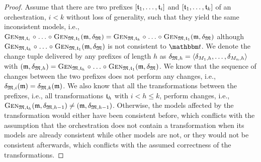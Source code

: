 \begin{proof}
    Assume that there are two prefixes $\sequenced{\transformation{t}_{1}, \dots, \transformation{t}_{i}}$ and $\sequenced{\transformation{t}_{1}, \dots, \transformation{t}_{k}}$ of an orchestration, $i < k$ without loss of generality, such that they yield the same inconsistent models, i.e., $\generalizationfunction{\metamodeltuple{M}, \transformation{t}_{i}} \concatfunction \dots \concatfunction \generalizationfunction{\metamodeltuple{M}, \transformation{t}_{1}}(\modeltuple{m}, \changetuple{\metamodeltuple{M}}) = \generalizationfunction{\metamodeltuple{M}, \transformation{t}_{k}} \concatfunction \dots \concatfunction \generalizationfunction{\metamodeltuple{M}, \transformation{t}_{1}}(\modeltuple{m}, \changetuple{\metamodeltuple{M}})$ although $\generalizationfunction{\metamodeltuple{M}, \transformation{t}_{k}} \concatfunction \dots \concatfunction \generalizationfunction{\metamodeltuple{M}, \transformation{t}_{1}}(\modeltuple{m}, \changetuple{\metamodeltuple{M}})$ is not consistent to $\transformationset{T}$.
    We denote the change tuple delivered by any prefixes of length $h$ as $\changetuple{\metamodeltuple{M},h} = \tupled{\change{\metamodel{M}{1},h}, \dots, \change{\metamodel{M}{n}, h}}$ with $(\modeltuple{m}, \changetuple{\metamodeltuple{M},h}) = \generalizationfunction{\metamodeltuple{M}, \transformation{t}_{h}} \concatfunction \dots \concatfunction \generalizationfunction{\metamodeltuple{M}, \transformation{t}_{1}}(\modeltuple{m}, \changetuple{\metamodeltuple{M}})$.
    We know that the sequence of changes between the two prefixes does not perform any changes, i.e., $\changetuple{\metamodeltuple{M},i}(\modeltuple{m}) = \changetuple{\metamodeltuple{M},k}(\modeltuple{m})$.
    We also know that all the transformations between the prefixes, i.e., all transformations $\transformation{t}_{h}$ with $i < h \leq k$, perform changes, i.e., $\generalizationfunction{\metamodeltuple{M}, \transformation{t}_{h}}(\modeltuple{m}, \changetuple{\metamodeltuple{M},h-1}) \neq (\modeltuple{m}, \changetuple{\metamodeltuple{M},h-1})$.
    Otherwise, the models affected by the transformation would either have been consistent before, which conflicts with the assumption that the orchestration does not contain a transformation when its models are already consistent while other models are not, or they would not be consistent afterwards, which conflicts with the assumed correctness of the transformations.


\end{proof}

